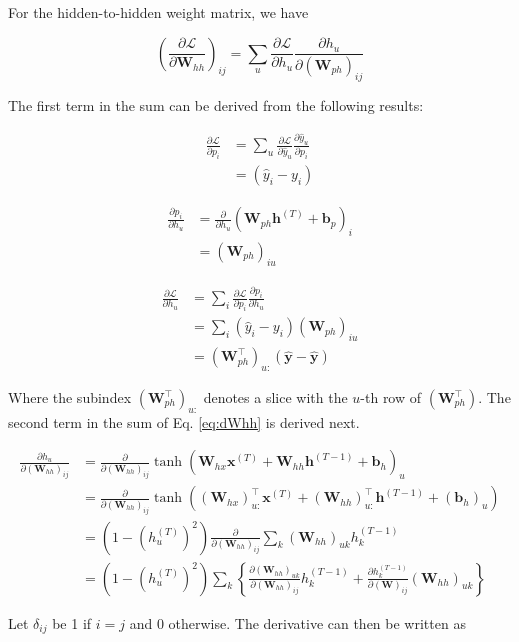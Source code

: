 \documentclass{article}
\newcommand{\pd}[2]{\frac{\partial #1}{\partial #2}}
\begin{document}
For the hidden-to-hidden weight matrix, we have

\begin{equation}
\left(\pd{\mathcal{L}}{\mathbf{W}_{hh}}\right)_{ij} = \sum_u\pd{\mathcal{L}}{h_u}\pd{h_u}{(\mathbf{W}_{ph})_{ij}}
\label{eq:dWhh}
\end{equation}

The first term in the sum can be derived from the following results:

\begin{align*}
\pd{\mathcal{L}}{p_i} &= \sum_u\pd{\mathcal{L}}{\hat{y}_u}\pd{\hat{y}_u}{p_i} \\
&= (\hat{y}_i - y_i)
\end{align*}

\begin{align*}
\pd{p_i}{h_u} &= \pd{}{h_u}(\mathbf{W}_{ph}\mathbf{h}^{(T)} + \mathbf{b}_p)_i \\
&= (\mathbf{W}_{ph})_{iu}
\end{align*}

\begin{align*}
\pd{\mathcal{L}}{h_u} &= \sum_i\pd{\mathcal{L}}{p_i}\pd{p_i}{h_u} \\
&= \sum_i(\hat{y}_i - y_i)(\mathbf{W}_{ph})_{iu} \\
&= (\mathbf{W}_{ph}^\top)_{u:}(\hat{\mathbf{y}} - \hat{\mathbf{y}})
\end{align*}

Where the subindex $(\mathbf{W}_{ph}^\top)_{u:}$ denotes a slice with the $u$-th row of $(\mathbf{W}_{ph}^\top)$. The second term in the sum of Eq. \ref{eq:dWhh} is derived next.

\begin{align*}
\pd{h_u}{(\mathbf{W}_{hh})_{ij}} &=
\pd{}{(\mathbf{W}_{hh})_{ij}}\tanh(\mathbf{W}_{hx}\mathbf{x}^{(T)} + \mathbf{W}_{hh}\mathbf{h}^{(T-1)} + \mathbf{b}_h)_u \\
&=
\pd{}{(\mathbf{W}_{hh})_{ij}}\tanh((\mathbf{W}_{hx})_{u:}^\top\mathbf{x}^{(T)} + (\mathbf{W}_{hh})_{u:}^\top\mathbf{h}^{(T-1)} + (\mathbf{b}_h)_u) \\
&=
(1 - (h_u^{(T)})^2) \pd{}{(\mathbf{W}_{hh})_{ij}}\sum_k (\mathbf{W}_{hh})_{uk}h^{(T-1)}_k \\
&=
(1 - (h_u^{(T)})^2) \sum_k\left\lbrace \pd{(\mathbf{W}_{hh})_{uk}}{(\mathbf{W}_{hh})_{ij}}h^{(T-1)}_k + \pd{h_k^{(T-1)}}{(\mathbf{W})_{ij}}(\mathbf{W}_{hh})_{uk}\right\rbrace
\end{align*}

Let $\delta_{ij}$ be 1 if $i=j$ and 0 otherwise. The derivative can then be written as
\end{document}
